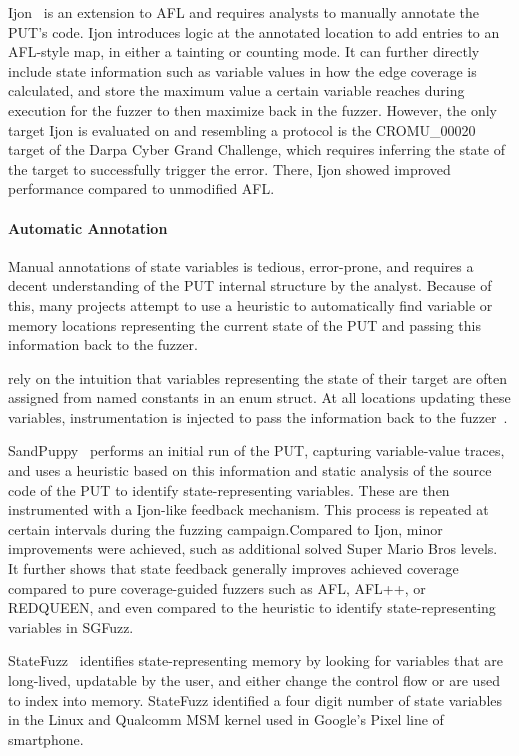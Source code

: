 \documentclass[twocolumn]{article}
\let\savedCite=\cite
\renewcommand{\cite}{\unskip~\savedCite}
\begin{document}
Ijon\cite{Ijon} is an extension to AFL and requires analysts to manually annotate the PUT's code. Ijon introduces logic at the annotated location to add entries to an AFL-style map, in either a tainting or counting mode. It can further directly include state information such as variable values in how the edge coverage is calculated, and store the maximum value a certain variable reaches during execution for the fuzzer to then maximize back in the fuzzer. However, the only target Ijon is evaluated on and resembling a protocol is the CROMU\_00020 target of the Darpa Cyber Grand Challenge, which requires inferring the state of the target to successfully trigger the error. There, Ijon showed improved performance compared to unmodified AFL.

\paragraph{Automatic Annotation}

Manual annotations of state variables is tedious, error-prone, and requires a decent understanding of the PUT internal structure by the analyst. Because of this, many projects attempt to use a heuristic to automatically find variable or memory locations representing the current state of the PUT and passing this information back to the fuzzer.

\citeauthor{SGFuzz} rely on the intuition that variables representing the state of their target are often assigned from named constants in an enum struct. At all locations updating these variables, instrumentation is injected to pass the information back to the fuzzer\cite{SGFuzz}.

SandPuppy\cite{SandPuppy} performs an initial run of the PUT, capturing variable-value traces, and uses a heuristic based on this information and static analysis of the source code of the PUT to identify state-representing variables. These are then instrumented with a Ijon-like feedback mechanism. This process is repeated at certain intervals during the fuzzing campaign.Compared to Ijon, minor improvements were achieved, such as additional solved Super Mario Bros levels. It further shows that state feedback generally improves achieved coverage compared to pure coverage-guided fuzzers such as AFL, AFL++, or REDQUEEN, and even compared to the heuristic to identify state-representing variables in SGFuzz.

StateFuzz\cite{StateFuzz} identifies state-representing memory by looking for variables that are long-lived, updatable by the user, and either change the control flow or are used to index into memory. StateFuzz identified a four digit number of state variables in the Linux and Qualcomm MSM kernel used in Google's Pixel line of smartphone.
\end{document}
